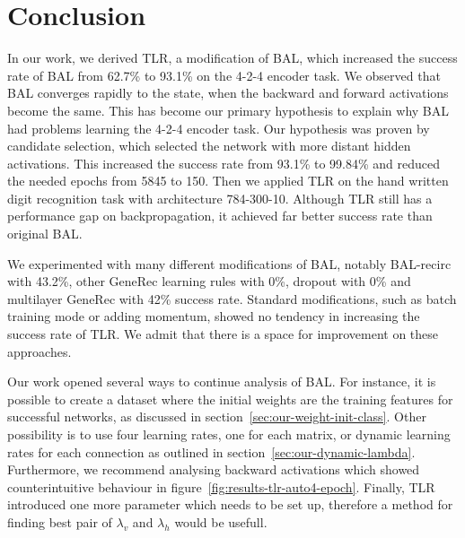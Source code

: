 
\section*{Conclusion}
\label{sec:conclusion} 

In our work, we derived TLR, a modification of BAL, which increased the success rate of BAL from 62.7\% to 93.1\% on the 4-2-4 encoder task. We observed that BAL converges rapidly to the state, when the backward and forward activations become the same. This has become our primary hypothesis to explain why BAL had problems learning the 4-2-4 encoder task. Our hypothesis was proven by candidate selection, which selected the network with more distant hidden activations. This increased the success rate from 93.1\% to 99.84\% and reduced the needed epochs from 5845 to 150. Then we applied TLR on the hand written digit recognition task with architecture 784-300-10. Although TLR still has a performance gap on backpropagation, it achieved far better success rate than original BAL. %

We experimented with many different modifications of BAL, notably BAL-recirc with 43.2\%, other GeneRec learning rules with 0\%, dropout with 0\% and multilayer GeneRec with 42\% success rate. Standard modifications, such as batch training mode or adding momentum, showed no tendency in increasing the success rate of TLR. We admit that there is a space for improvement on these approaches.

\label{sec:future-work}
Our work opened several ways to continue analysis of BAL. For instance, it is possible to create a dataset where the initial weights are the training features for successful networks, as discussed in section~\ref{sec:our-weight-init-class}. Other possibility is to use four learning rates, one for each matrix, or dynamic learning rates for each connection as outlined in section~\ref{sec:our-dynamic-lambda}. Furthermore, we recommend analysing backward activations which showed counterintuitive behaviour in figure~\ref{fig:results-tlr-auto4-epoch}. Finally, TLR introduced one more parameter which needs to be set up, therefore a method for finding best pair of $\lambda_v$ and $\lambda_h$ would be usefull. 

